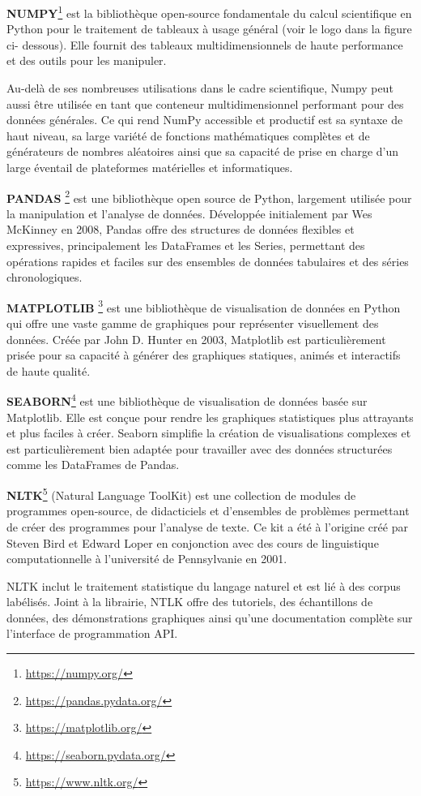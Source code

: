  \textbf{NUMPY}\footnote{\href{https://numpy.org/}{https://numpy.org/}} est la bibliothèque open-source fondamentale du calcul scientifique en Python pour le traitement de tableaux à usage général (voir le logo dans la figure ci- dessous). Elle fournit des tableaux multidimensionnels de haute performance et des outils pour les manipuler. \par
 Au-delà de ses nombreuses utilisations dans le cadre scientifique, Numpy peut aussi être utilisée en tant que conteneur multidimensionnel performant pour des données générales. Ce qui rend NumPy accessible et productif est sa syntaxe de haut niveau, sa large variété de fonctions mathématiques complètes et de générateurs de nombres aléatoires ainsi que sa capacité de prise en charge d’un large éventail de plateformes matérielles et informatiques. 
 \par
 
\textbf{PANDAS}
\footnote{\href{https://pandas.pydata.org/}{https://pandas.pydata.org/}} est une bibliothèque open source de Python, largement utilisée pour la manipulation et l'analyse de données. Développée initialement par Wes McKinney en 2008, Pandas offre des structures de données flexibles et expressives, principalement les DataFrames et les Series, permettant des opérations rapides et faciles sur des ensembles de données tabulaires et des séries chronologiques. \par

\textbf{MATPLOTLIB} \footnote{\href{https://matplotlib.org/}{https://matplotlib.org/}} est une bibliothèque de visualisation de données en Python qui offre une vaste gamme de graphiques pour représenter visuellement des données. Créée par John D. Hunter en 2003, Matplotlib est particulièrement prisée pour sa capacité à générer des graphiques statiques, animés et interactifs de haute qualité.\par

\textbf{SEABORN}\footnote{\href{https://seaborn.pydata.org/}{https://seaborn.pydata.org/}} est une bibliothèque de visualisation de données basée sur Matplotlib. Elle est conçue pour rendre les graphiques statistiques plus attrayants et plus faciles à créer. Seaborn simplifie la création de visualisations complexes et est particulièrement bien adaptée pour travailler avec des données structurées comme les DataFrames de Pandas.\par 

\textbf{NLTK}\footnote{\href{https://www.nltk.org/}{https://www.nltk.org/}} (Natural Language ToolKit) est une collection de modules de programmes open-source, de didacticiels et d’ensembles de problèmes permettant de créer des programmes pour l’analyse de texte. Ce kit a été à l’origine créé par Steven Bird et Edward Loper en conjonction avec des cours de linguistique computationnelle à l’université de Pennsylvanie en 2001.\par
NLTK inclut le traitement statistique du langage naturel et est lié à des corpus labélisés. Joint à la librairie, NTLK offre des tutoriels, des échantillons de données, des démonstrations graphiques ainsi qu’une documentation complète sur l’interface de programmation API.\par


